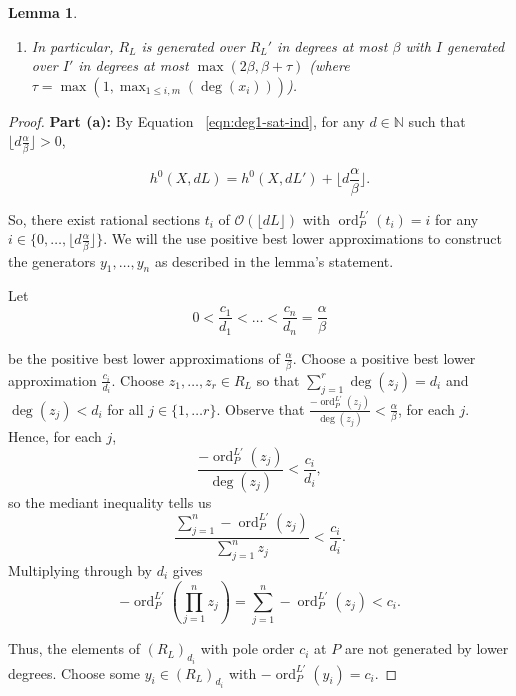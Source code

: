 \documentclass{amsart}
\theoremstyle{plain}
\newtheorem{lem}[thm]{Lemma}
\theoremstyle{definition}
\theoremstyle{remark}
\numberwithin{equation}{section}
\newcommand\sco{{\mathscr O}}
\DeclareMathOperator{\ord}{ord}
\newcommand{\halfcan}{L}
\begin{document}
\begin{lem}
\begin{enumerate}
\item[(c)] In particular, $R_\halfcan$ is generated over $R_\halfcan'$ in degrees at most $\beta$ with $I$ generated over $I'$ in degrees at most $\max(2\beta, \beta + \tau)$ (where $\tau = \max(1, \max_{1\le i, m}(\deg(x_i)))$).
\end{enumerate}
\end{lem}

\begin{proof}
{\bf Part (a):}
By
Equation ~\ref{eqn:deg1-sat-ind}, for any $d
\in \mathbb{N}$ such that $\lfloor d \frac{ \alpha}{\beta} \rfloor > 0$,

\[
	h^0 (X, d \halfcan ) = h^0(X, d\halfcan') + \lfloor d\frac{\alpha}{\beta}\rfloor.
\]

\noindent
So,  there exist rational sections $t_i$ of $\sco(\lfloor d\halfcan \rfloor)$ with $\ord_P^{L'}(t_i) = i$
for any $i \in \{0, \ldots, \lfloor d \frac{\alpha}{
\beta} \rfloor \}$. We will the use positive best lower approximations to
construct the generators $y_1, \ldots, y_n$ as described in the lemma's statement.

Let 
\[
	0 < \frac{c_1}{d_1} < \ldots < \frac{c_n}{d_n} = \frac{\alpha}{
	\beta}
\]

\noindent
be the positive best lower approximations of $\frac{
\alpha}{\beta}$. 
Choose a positive best lower approximation $\frac{c_i}{d_i}$.  Choose $z_1, \ldots, z_r \in R_\halfcan$ so that $\sum_{j=1}^r \deg(z_j) = d_i$ and $\deg(z_j)<d_i$ for all $j\in \{1, \ldots r\}$. Observe that $\frac{-\ord_P^{\halfcan'}(z_j)}{\deg(z_j)}< \frac{\alpha}{\beta}$, for each $j$.  Hence, for each $j$, 
\[
	\frac{-\ord_P^{\halfcan'}(z_j)}{\deg(z_j)} < \frac{c_i}{d_i},
\]
so the mediant inequality tells us
\[
	\frac{\sum_{j=1}^n -\ord^{\halfcan'}_P(z_j)}{\sum_{j=1}^n z_j } < \frac{c_i}{d_i}.
\]
Multiplying through by $d_i$ gives
\[
	-\ord^{\halfcan'}_P \left(\prod_{j=1}^n z_j \right) = \sum_{j=1}^n -\ord^{\halfcan'}_P(z_j) < c_i .
\]

\noindent
Thus, the elements of $(R_{\halfcan})_{d_i}$ with pole order $c_i$ at $P$ are not generated by 
lower degrees. 
Choose some $y_i \in(R_{
\halfcan})_{d_i}$ with $-\ord_{P}^{L'}(y_i)=c_i$.


\end{proof}
\end{document}

